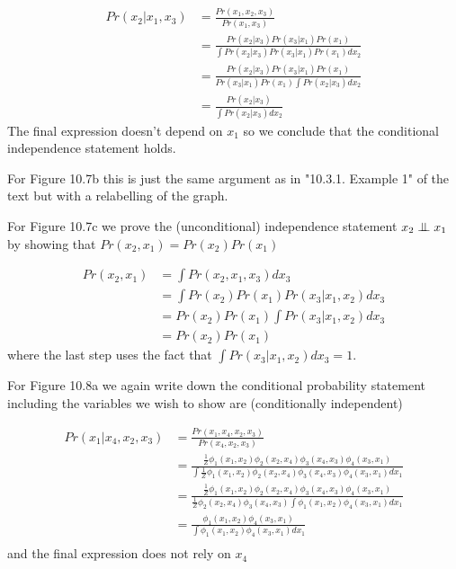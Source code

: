 \documentclass[11pt]{report}
\newcommand\independent{\protect\mathpalette{\protect\independenT}{\perp}}
\def\independenT#1#2{\mathrel{\rlap{$#1#2$}\mkern4mu{#1#2}}}
\begin{document}
\begin{align*}
Pr(x_2 | x_1, x_3) & = \frac{Pr(x_1, x_2, x_3)}{Pr(x_1, x_3)} \\
   & = \frac{Pr(x_2 | x_3) Pr(x_3 | x_1) Pr(x_1)}{\int Pr(x_2 | x_3) Pr(x_3 | x_1) Pr(x_1) dx_2} \\
   & = \frac{Pr(x_2 | x_3) Pr(x_3 | x_1) Pr(x_1)}{Pr(x_3 | x_1) Pr(x_1) \int Pr(x_2 | x_3)  dx_2} \\
   & = \frac{Pr(x_2| x_3)}{\int Pr(x_2 | x_3)  dx_2}
\end{align*}
The final expression doesn't depend on $x_1$ so we conclude that the conditional independence statement holds.

For Figure 10.7b this is just the same argument as in "10.3.1. Example 1" of the text but with a relabelling of the graph.

For Figure 10.7c we prove the (unconditional) independence statement $x_2 \independent x_1$ by showing that $Pr(x_2, x_1) = Pr(x_2) Pr(x_1)$

\begin{align*}
Pr(x_2,  x_1) & = \int Pr(x_2, x_1, x_3) dx_3 \\
   & = \int Pr(x_2) Pr(x_1) Pr(x_3 | x_1, x_2) dx_3 \\
   & = Pr(x_2) Pr(x_1) \int Pr(x_3 | x_1, x_2) dx_3 \\
   & = Pr(x_2) Pr(x_1)
\end{align*}
where the last step uses the fact that $\int Pr(x_3 | x_1, x_2) dx_3  = 1$.

For Figure 10.8a we again write down the conditional probability statement including the variables we wish to show are (conditionally independent)

\begin{align*}
Pr(x_1 | x_4, x_2, x_3) & = \frac{Pr(x_1, x_4, x_2, x_3)}{Pr(x_4, x_2, x_3)} \\
   & = \frac{\frac{1}{Z} \phi_1(x_1, x_2) \phi_2(x_2, x_4) \phi_3(x_4, x_3) \phi_4(x_3, x_1)}
            {\int \frac{1}{Z} \phi_1(x_1, x_2) \phi_2(x_2, x_4) \phi_3(x_4, x_3) \phi_4(x_3, x_1) dx_1} \\
   & = \frac{\frac{1}{Z} \phi_1(x_1, x_2) \phi_2(x_2, x_4) \phi_3(x_4, x_3) \phi_4(x_3, x_1)}
            {\frac{1}{Z} \phi_2(x_2, x_4) \phi_3(x_4, x_3) \int  \phi_1(x_1, x_2)  \phi_4(x_3, x_1) dx_1} \\
   & = \frac{ \phi_1(x_1, x_2)  \phi_4(x_3, x_1)}
            { \int \phi_1(x_1, x_2)  \phi_4(x_3, x_1) dx_1} \\
\end{align*}
and the final expression does not rely on $x_4$
\end{document}
